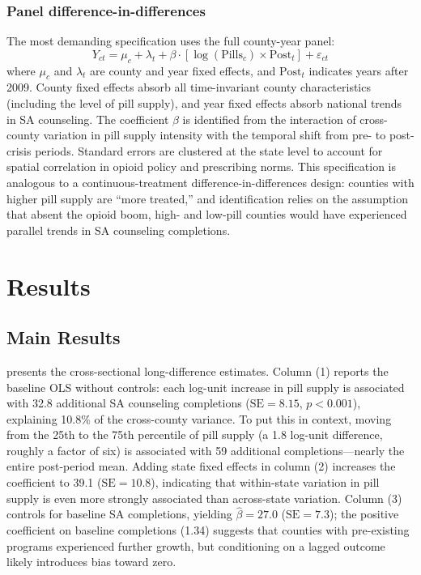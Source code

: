 \documentclass[12pt]{article}
\begin{document}
\subsubsection*{Panel difference-in-differences} The most demanding specification uses the full county-year panel:
\begin{equation}
Y_{ct} = \mu_c + \lambda_t + \beta \cdot [\log(\text{Pills}_c) \times \text{Post}_t] + \varepsilon_{ct}
\label{eq:panel}
\end{equation}
where $\mu_c$ and $\lambda_t$ are county and year fixed effects, and $\text{Post}_t$ indicates years after 2009. County fixed effects absorb all time-invariant county characteristics (including the level of pill supply), and year fixed effects absorb national trends in SA counseling. The coefficient $\beta$ is identified from the interaction of cross-county variation in pill supply intensity with the temporal shift from pre- to post-crisis periods. Standard errors are clustered at the state level to account for spatial correlation in opioid policy and prescribing norms. This specification is analogous to a continuous-treatment difference-in-differences design: counties with higher pill supply are ``more treated,'' and identification relies on the assumption that absent the opioid boom, high- and low-pill counties would have experienced parallel trends in SA counseling completions.


\section{Results}

\subsection{Main Results}

 presents the cross-sectional long-difference estimates. Column (1) reports the baseline OLS without controls: each log-unit increase in pill supply is associated with 32.8 additional SA counseling completions ($\text{SE} = 8.15$, $p < 0.001$), explaining 10.8\% of the cross-county variance. To put this in context, moving from the 25th to the 75th percentile of pill supply (a 1.8 log-unit difference, roughly a factor of six) is associated with 59 additional completions---nearly the entire post-period mean. Adding state fixed effects in column (2) increases the coefficient to 39.1 ($\text{SE} = 10.8$), indicating that within-state variation in pill supply is even more strongly associated than across-state variation. Column (3) controls for baseline SA completions, yielding $\hat{\beta} = 27.0$ ($\text{SE} = 7.3$); the positive coefficient on baseline completions (1.34) suggests that counties with pre-existing programs experienced further growth, but conditioning on a lagged outcome likely introduces bias toward zero.
\end{document}
